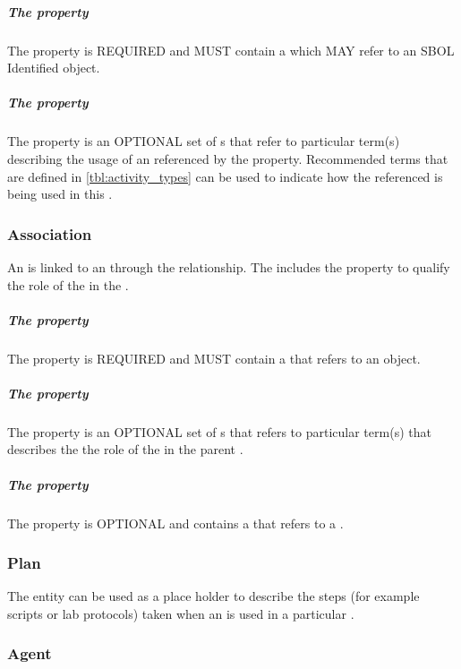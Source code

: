 \subparagraph{The  property}\label{sec:entity}
The  property is REQUIRED and MUST contain a  which MAY refer to an SBOL Identified object.

\subparagraph{The  property}\label{sec:roles:U}
The  property is an OPTIONAL set of s that refer to particular term(s) describing the usage of an  referenced by the  property. Recommended terms that are defined in \ref{tbl:activity_types} can be used to indicate how the referenced  is being used in this .

\subsubsection{Association}
\label{sec:Association}
An  is linked to an  through the  relationship. The  includes the  property to qualify the role of the  in the .

\subparagraph{The  property}\label{sec:agent}
The  property is REQUIRED and MUST contain a  that refers to an  object.

\subparagraph{The  property}\label{sec:roles:A}
The  property is an OPTIONAL set of s that refers to particular term(s) that describes the the role of the  in the parent . 

\subparagraph{The  property}\label{sec:plan}
The  property is OPTIONAL and contains a  that refers to a .

\subsubsection{Plan}
\label{sec:prov:Plan}

 The  entity can be used as a place holder to describe the steps (for example scripts or lab protocols) taken when an  is used in a particular . 

\subsubsection{Agent}
\label{sec:prov:Agent}

